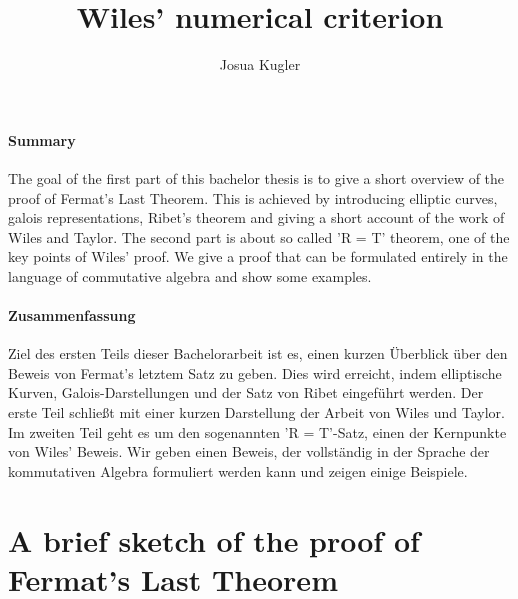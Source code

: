 \documentclass{article}
\title{Wiles' numerical criterion}
\author{Josua Kugler}
\theoremstyle{plain}%
\theoremstyle{definition}
\theoremstyle{remark}
\begin{document}
\maketitle

\paragraph{Summary}
The goal of the first part of this bachelor thesis is to give a 
short overview of the proof of Fermat's Last Theorem.
This is achieved by introducing elliptic curves, galois representations, 
Ribet's theorem and giving a short account of the work of Wiles and Taylor.
The second part is about so called 'R = T' theorem, one of the key points of Wiles' proof.
We give a proof that can be formulated entirely in the language of commutative algebra
and show some examples.

\paragraph{Zusammenfassung}
Ziel des ersten Teils dieser Bachelorarbeit ist es, einen kurzen Überblick 
über den Beweis von Fermat's letztem Satz zu geben.
Dies wird erreicht, indem elliptische Kurven, Galois-Darstellungen und der Satz von Ribet eingeführt werden.
Der erste Teil schließt mit einer kurzen Darstellung der Arbeit von Wiles und Taylor.
Im zweiten Teil geht es um den sogenannten 'R = T'-Satz, einen der Kernpunkte von Wiles' Beweis.
Wir geben einen Beweis, der vollständig in der Sprache der kommutativen Algebra formuliert werden kann
und zeigen einige Beispiele.

\newpage
\tableofcontents
\newpage

\section{A brief sketch of the proof of Fermat's Last Theorem}
\end{document}
